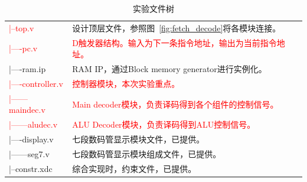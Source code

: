 \begin{table}[htbp]
    \centering
    \begin{tabu}{|l|l|}
        \hline
        \textcolor{red}{|--top.v}& 设计顶层文件，参照图~\ref{fig:fetch_decode}将各模块连接。 \\
        \textcolor{red}{|----pc.v} &\textcolor{red}{D触发器结构。输入为下一条指令地址，输出为当前指令地址。}  \\
        |----ram.ip&RAM IP，通过Block memory generator进行实例化。  \\
        \textcolor{red}{|----controller.v} &\textcolor{red}{ 控制器模块，本次实验重点。} \\
        \textcolor{red}{|------maindec.v} & \textcolor{red}{Main decoder模块，负责译码得到各个组件的控制信号。} \\
        \textcolor{red}{|------aludec.v} & \textcolor{red}{ALU Decoder模块，负责译码得到ALU控制信号。}\\
        \rowfont{\color{gray}}
        |----display.v& 七段数码管显示模块文件，已提供。 \\
        \rowfont{\color{gray}}
        |------seg7.v& 七段数码管显示模块组成文件，已提供。 \\
        \rowfont{\color{gray}}
        |--constr.xdc&综合实现时，约束文件，已提供。  \\
        
        
        \hline
    \end{tabu}
    \caption{实验文件树}
    \label{tab:file_tree}
\end{table}

